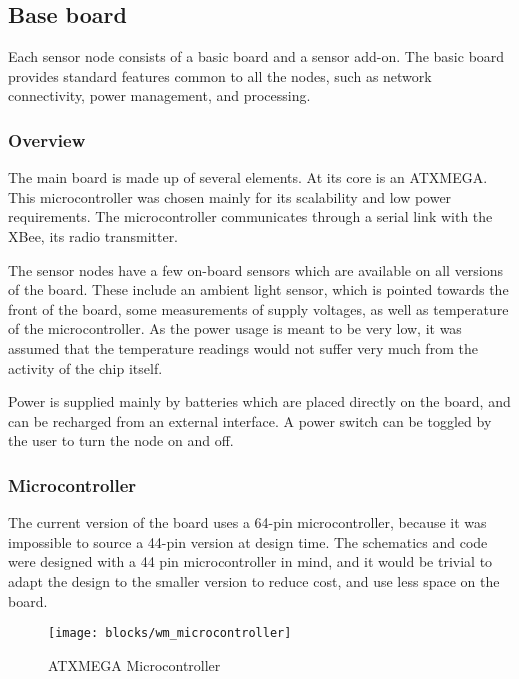 \subsection{Base board}

Each sensor node consists of a basic board and a sensor add-on. The basic board
provides standard features common to all the nodes, such as network
connectivity, power management, and processing.

\subsubsection{Overview}

The main board is made up of several elements. At its core is an ATXMEGA. This
microcontroller was chosen mainly for its scalability and low power
requirements. The microcontroller communicates through a serial link with the
XBee, its radio transmitter.

The sensor nodes have a few on-board sensors which are available on all versions
of the board. These include an ambient light sensor, which is pointed towards
the front of the board, some measurements of supply voltages, as well as
temperature of the microcontroller. As the power usage is meant to be very low,
it was assumed that the temperature readings would not suffer very much from
the activity of the chip itself.

Power is supplied mainly by batteries which are placed directly on the board,
and can be recharged from an external interface. A power switch can be toggled
by the user to turn the node on and off.

\subsubsection{Microcontroller}

The current version of the board uses a 64-pin microcontroller, because it
was impossible to source a 44-pin version at design time. The schematics and
code were designed with a 44 pin microcontroller in mind, and it would be
trivial to adapt the design to the smaller version to reduce cost, and use less
space on the board.

\begin{figure}[htpb]
  \begin{center}
    \texttt{[image: blocks/wm\_microcontroller]}
  \end{center}
  \caption{ATXMEGA Microcontroller}
  \label{fig:microcontroller}
\end{figure}


